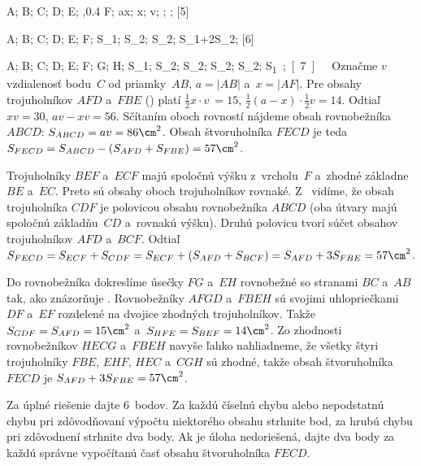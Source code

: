 {%
\fontplace
\rtpoint A; \ltpoint B; \bpoint C; \bpoint D;
\lpoint E; \bpoint{},0.4 F;
\bpoint a\mathbin{\smash-}x; \bpoint x; \lpoint v;
; ;
[5] \hfil\Obr

\fontplace
\tpoint A; \tpoint B; \bpoint C; \bpoint D;
\lpoint E; \tpoint F;
\cpoint S_1; \cpoint S_2;
\cpoint S_2; \cpoint S_1+2S_2;
[6] \hfil\Obr

\fontplace
\tpoint A; \tpoint B; \bpoint C; \bpoint D;
\lpoint E; \tpoint F; \bpoint G; \rpoint H;
\cpoint S_1; \cpoint S_2;
\cpoint S_2; \cpoint S_2; \cpoint S_2; \cpoint\up\unit S_1;
[7] \hfil\Obr

Označme $v$ vzdialenosť bodu~$C$ od priamky~$AB$, $a = |AB|$ a~$x =|AF|$.
Pre obsahy trojuholníkov $AFD$ a~$FBE$ (\obr) platí
$\frac12x \cdot v~=15$, $\frac12(a - x)\cdot \frac12v =14$.
Odtiaľ $xv = 30$, $av - xv = 56$.
Sčítaním oboch rovností nájdeme obsah rovnobežníka $ABCD$: $S_{ABCD}
= av =86\cm^2$. Obsah štvoruholníka $FECD$ je teda
$S_{FECD}=S_{ABCD}-(S_{AFD} +S_{FBE})= 57\cm^2$.

\twocpictures

\ineriesenie
Trojuholníky $BEF$ a~$ECF$ majú spoločnú výšku z~vrcholu~$F$ a~zhodné základne
$BE$ a~$EC$. Preto sú obsahy oboch trojuholníkov rovnaké.
Z~\obr{} vidíme, že obsah trojuholníka $CDF$ je polovicou obsahu
rovnobežníka $ABCD$ (oba útvary majú spoločnú základňu~$CD$
a~rovnakú výšku). Druhú polovicu tvorí súčet obsahov trojuholníkov
$AFD$ a~$BCF$. Odtiaľ $S_{FECD} =S_{ECF} +S_{CDF} =S_{ECF} +(S_{AFD} +S_{BCF})=
S_{AFD} +3S_{FBE} =57\cm^2$.

\ineriesenie
Do rovnobežníka dokreslíme úsečky $FG$ a~$EH$ rovnobežné
so stranami $BC$ a~$AB$ tak, ako znázorňuje \obr.
\inspicture{}
Rovnobežníky $AFGD$ a~$FBEH$ sú svojimi
uhlopriečkami $DF$ a~$EF$ rozdelené na dvojice zhodných trojuholníkov.
Takže $S_{GDF} = S_{AFD} = 15\cm^2$ a~$S_{HFE} =S_{BEF} =14\cm^2$. Zo
zhodnosti rovnobežníkov $HECG$ a~$FBEH$ navyše ľahko nahliadneme, že
všetky štyri trojuholníky $FBE$, $EHF$, $HEC$ a~$CGH$ sú zhodné,
takže obsah štvoruholníka $FECD$ je $S_{AFD} +3S_{FBE} =57\cm^2$.

\nobreak\medskip\petit\noindent
Za úplné riešenie dajte 6~bodov.
Za každú číselnú chybu alebo nepodstatnú chybu pri zdôvodňovaní
výpočtu niektorého obsahu strhnite bod, za hrubú chybu pri
zdôvodnení strhnite dva body. Ak je úloha nedoriešená, dajte dva
body za každú správne vypočítanú časť obsahu štvoruholníka $FECD$.

\endpetit
\bigbreak}

